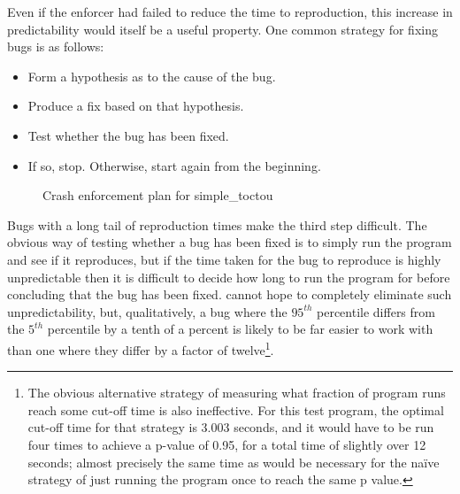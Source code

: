 Even if the enforcer had failed to reduce the time to reproduction,
this increase in predictability would itself be a useful property.
One common strategy for fixing bugs is as follows:

\begin{itemize}
\item Form a hypothesis as to the cause of the bug.
\item Produce a fix based on that hypothesis.
\item Test whether the bug has been fixed.
\item If so, stop.  Otherwise, start again from the beginning.
\end{itemize}

\begin{figure}
  \caption{Crash enforcement plan for simple\_toctou}
  \label{fig:eval:simple_toctou:enforce_plan}
\end{figure}

Bugs with a long tail of reproduction times make the third step
difficult.  The obvious way of testing whether a bug has been fixed is
to simply run the program and see if it reproduces, but if the time
taken for the bug to reproduce is highly unpredictable then it is
difficult to decide how long to run the program for before concluding
that the bug has been fixed.  {\Technique} cannot hope to completely
eliminate such unpredictability, but, qualitatively, a bug where the
$95^{th}$ percentile differs from the $5^{th}$ percentile by a tenth
of a percent is likely to be far easier to work with than one where
they differ by a factor of twelve\footnote{The obvious alternative
  strategy of measuring what fraction of program runs reach some
  cut-off time is also ineffective.  For this test program, the
  optimal cut-off time for that strategy is 3.003 seconds, and it
  would have to be run four times to achieve a p-value of 0.95, for a
  total time of slightly over 12 seconds; almost precisely the same
  time as would be necessary for the na\"{i}ve strategy of just
  running the program once to reach the same p value.}.

